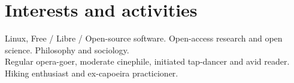 \documentclass[a4paper,10pt]{article}
\begin{document}

\vspace{-15pt}

\section{Interests and activities}

Linux, Free / Libre / Open-source software. Open-access research and open science. Philosophy and sociology. \\
Regular opera-goer, moderate cinephile, initiated tap-dancer and avid reader. \\
Hiking enthusiast and ex-capoeira practicioner.
\end{document}
